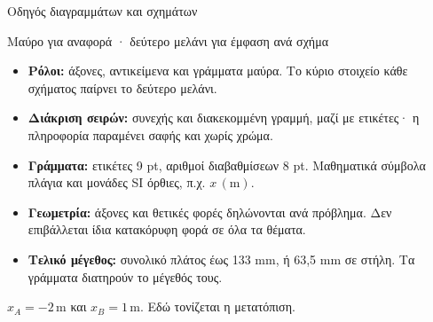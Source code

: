 \setcounter{chapter}{1}
\thispagestyle{plain}
\begin{center}
{\BookHeadingFont\color{BookPrimary}\fontsize{17}{22}\selectfont Οδηγός διαγραμμάτων και σχημάτων}\par
\smallskip
{\color{BookInk}\small Μαύρο για αναφορά · δεύτερο μελάνι για έμφαση ανά σχήμα}
\end{center}
\begin{itemize}
\item \textbf{Ρόλοι:} άξονες, αντικείμενα και γράμματα μαύρα. Το κύριο στοιχείο κάθε σχήματος παίρνει το δεύτερο μελάνι.
\item \textbf{Διάκριση σειρών:} συνεχής και διακεκομμένη γραμμή, μαζί με ετικέτες· η πληροφορία παραμένει σαφής και χωρίς χρώμα.
\item \textbf{Γράμματα:} ετικέτες 9 pt, αριθμοί διαβαθμίσεων 8 pt. Μαθηματικά σύμβολα πλάγια και μονάδες SI όρθιες, π.χ. $x\,(\mathrm{m})$.
\item \textbf{Γεωμετρία:} άξονες και θετικές φορές δηλώνονται ανά πρόβλημα. Δεν επιβάλλεται ίδια κατακόρυφη φορά σε όλα τα θέματα.
\item \textbf{Τελικό μέγεθος:} συνολικό πλάτος έως 133 mm, ή 63,5 mm σε στήλη. Τα γράμματα διατηρούν το μέγεθός τους.
\end{itemize}
\noindent $x_A=-2\,\mathrm{m}$ και $x_B=1\,\mathrm{m}$. Εδώ τονίζεται η μετατόπιση.
\begin{center}
\label{fig:guide-displacement}
\end{center}
